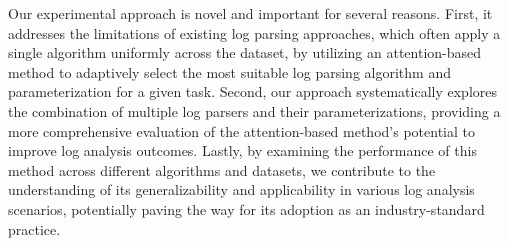 Our experimental approach is novel and important for several reasons. First, it addresses the limitations of existing log parsing approaches, which often apply a single algorithm uniformly across the dataset, by utilizing an attention-based method to adaptively select the most suitable log parsing algorithm and parameterization for a given task. Second, our approach systematically explores the combination of multiple log parsers and their parameterizations, providing a more comprehensive evaluation of the attention-based method's potential to improve log analysis outcomes. Lastly, by examining the performance of this method across different algorithms and datasets, we contribute to the understanding of its generalizability and applicability in various log analysis scenarios, potentially paving the way for its adoption as an industry-standard practice.
